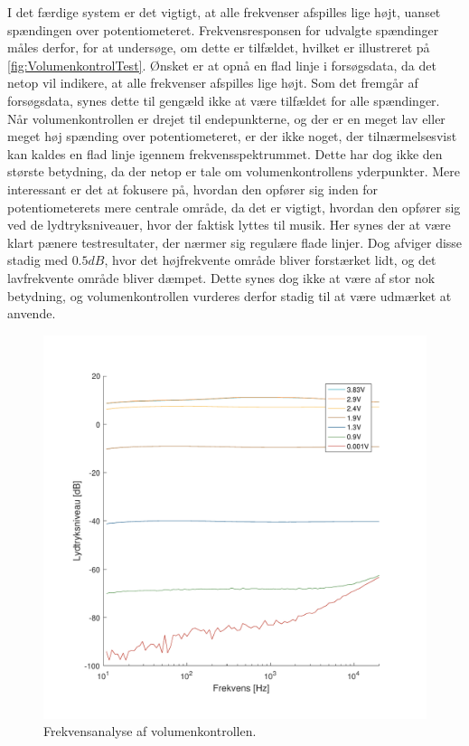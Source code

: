 \noindent
I det færdige system er det vigtigt, at alle frekvenser afspilles lige højt, uanset spændingen over potentiometeret. Frekvensresponsen for udvalgte spændinger måles derfor, for at undersøge, om dette er tilfældet, hvilket er illustreret på \autoref{fig:VolumenkontrolTest}. Ønsket er at opnå en flad linje i forsøgsdata, da det netop vil indikere, at alle frekvenser afspilles lige højt. Som det fremgår af forsøgsdata, synes dette til gengæld ikke at være tilfældet for alle spændinger. Når volumenkontrollen er drejet til endepunkterne, og der er en meget lav eller meget høj spænding over potentiometeret, er der ikke noget, der tilnærmelsesvist kan kaldes en flad linje igennem frekvensspektrummet. Dette har dog ikke den største betydning, da der netop er tale om volumenkontrollens yderpunkter. Mere interessant er det at fokusere på, hvordan den opfører sig inden for potentiometerets mere centrale område, da det er vigtigt, hvordan den opfører sig ved de lydtryksniveauer, hvor der faktisk lyttes til musik. Her synes der at være klart pænere testresultater, der nærmer sig regulære flade linjer. Dog afviger disse stadig med $0.5dB$, hvor det højfrekvente område bliver forstærket lidt, og det lavfrekvente område bliver dæmpet. Dette synes dog ikke at være af stor nok betydning, og volumenkontrollen vurderes derfor stadig til at være udmærket at anvende.
%
\newpage
\noindent
%
\begin{figure}[H]
	\centering
	\includegraphics[resolution=300,width=\textwidth]{Figure/VolumeControl.pdf}
	\caption{Frekvensanalyse af volumenkontrollen.}
	\label{fig:VolumenkontrolTest}
\end{figure}

